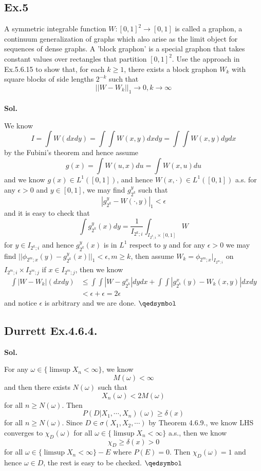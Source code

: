 \documentclass[lang=en,11pt,a4paper,citestyle =authoryear]{elegantpaper}
\newcommand{\prvd}{$\hfill \qedsymbol$}
\begin{document}
\subsection*{Ex.5} 
A symmetric integrable function $W:[0,1]^2 \to [0,1]$ is called a graphon, a continuum generalization of graphs which also arise as the limit object for sequences of dense graphs. A 'block graphon' is a special graphon that takes constant values over rectangles that partition $[0,1]^2$. Use the approach in Ex.5.6.15 to show that, for each $k\geq 1$, there exists a block graphon $W_k$ with square blocks of side lengths $2^{-k}$ such that
\[||W-W_k||_1 \to 0, k\to\infty\]
\vspace{0.5em}\\
\textbf{Sol.} \par
We know
\[
I = \int W (dxdy) = \int \int W(x,y) dx
dy = \int \int W(x,y) dy dx\]
by the Fubini's theorem and hence assume
\[g(x) = \int W(u,x)du = \int W(x,u)du\]
and we know $g(x) \in L^1([0,1])$, and hence $W(x,\cdot) \in L^1([0,1])$ a.s. for any $\epsilon > 0$ and $y\in [0,1]$, we may find $g^y_{2^k}$ such that
\[|g^y_{2^k} -W(\cdot,y)|_1 <\epsilon\]
and it is easy to check that
\[\int g^y_{2^k}(x) dy = \dfrac{1}{I_{2^k;i}}\int_{I_{2^k;i}\times [0,1]} W\]
for $y \in I_{2^k;i}$ and hence $g^y_{2^k}(x)$ is in $L^1$ respect to $y$ and for any $\epsilon > 0$ we may find $||\phi_{2^m;x}(y)-g^y_{2^k}(x)||_1 < \epsilon, m \geq k$, then assume $W_{k} = \phi_{2^m;x}|_{I_{2^m;i}}$ on $I_{2^m;i}\times I_{2^m;j}$ if $x\in I_{2^m;j}$, then we know
\[
\begin{aligned}
\int |W-W_k|(dxdy) &\leq \int \int |W-g_{2^k}^x| dy dx + \int\int |g_{2^k}^x(y) - W_k(x,y)| dx dy \\
& < \epsilon + \epsilon = 2\epsilon 
\end{aligned}
\]
and notice $\epsilon$ is arbitrary and we are done.
\prvd
\vspace{0.5em}

\subsection*{Durrett Ex.4.6.4.} 
\textbf{Sol.} \par
For any $\omega \in \{\limsup X_n < \infty\}$, we know
\[M(\omega) < \infty\]
and then there exists $N(\omega)$ such that
\[X_n(\omega) < 2M(\omega)\] for all $n\geq N(\omega)$. Then
\[P(D|X_1,\cdots,X_n)(\omega) \geq \delta(x)\]
for all $n\geq N(\omega)$. Since $D\in \sigma(X_1,X_2,\cdots)$ by Theorem 4.6.9., we know LHS converges to $\chi_D(\omega)$ for all $\omega \in \{\limsup X_n < \infty\}$ a.s., then we know
\[\chi_D \geq \delta(x)>0\] for all $\omega \in \{\limsup X_n < \infty\} - E$ where $P(E) = 0$. Then $\chi_D(\omega) = 1$ and hence $\omega \in D$, the rest is easy to be checked.
\prvd
\vspace{0.5em}
\end{document}
